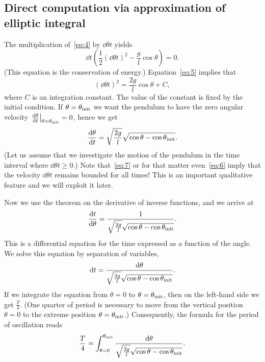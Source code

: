 \documentclass[reqno, a4paper]{amsart}
\begin{document}
\subsection{Direct computation via approximation of elliptic integral}
\label{sec:direct-comp-via}


The multiplication of~\eqref{eq:4} by $\dd{\theta}{t}$ yields
\begin{equation}
  \label{eq:5}
  \dd{}{t}
  \left(
    \frac{1}{2}
    \left(
      \dd{\theta}{t}
    \right)^2
    -
    \frac{g}{l}
    \cos \theta
  \right)
  =
  0
  .
\end{equation}
(This equation is the conservation of energy.) Equation~\eqref{eq:5} implies that
\begin{equation}
  \label{eq:6}
  \left(
    \dd{\theta}{t}
  \right)^2
  =
  \frac{2g}{l}
  \cos \theta
  +
  C
  ,
\end{equation}
where $C$ is an integration constant. The value of the constant is fixed by the initial condition. If $\theta = \theta_{\mathrm{init}}$ we want the pendulum to have the zero angular velocity $\left. \frac{\mathrm{d} {\theta}}{\mathrm{d} {t}} \right|_{\theta = \theta_{\mathrm{init}}}= 0$, hence we get
\begin{equation}
  \label{eq:7}
  \frac{\mathrm{d} {\theta}}{\mathrm{d} {t}}
  =
  \sqrt{
    \frac{2g}{l}
  }
  \sqrt{\cos \theta - \cos \theta_{\mathrm{init}}}.
\end{equation}
(Let us assume that we investigate the motion of the pendulum in the time interval where $\dd{\theta}{t} \geq 0$.) Note that~\eqref{eq:7} or for that matter even~\eqref{eq:6} imply that the velocity $\dd{\theta}{t}$ remains bounded for all times! This is an important qualitative feature and we will exploit it later.


Now we use the theorem on the derivative of inverse functions, and we arrive at
\begin{equation}
  \label{eq:8}
  \frac{\mathrm{d} {t}}{\mathrm{d} {\theta}}
  =
  \frac{1}
  {
    \sqrt{
      \frac{2g}{l}
    }
    \sqrt{\cos \theta - \cos \theta_{\mathrm{init}}}
  }
  .
\end{equation}
This is a differential equation for the time expressed as a function of the angle. We solve this equation by separation of variables,
\begin{equation}
  \label{eq:9}
  \mathrm{d} t  
  =
  \frac{\mathrm{d} \theta}
  {
    \sqrt{
      \frac{2g}{l}
    }
    \sqrt{\cos \theta - \cos \theta_{\mathrm{init}}}
  }
  .
\end{equation}
If we integrate the equation from $\theta=0$ to $\theta=\theta_{\mathrm{init}}$, then on the left-hand side we get $\frac{T}{4}$. (One quarter of period is necessary to move from the vertical position $\theta=0$ to the extreme position $\theta=\theta_{\mathrm{init}}$.) Consequently, the formula for the period of oscillation reads
\begin{equation}
  \label{eq:10}
  \frac{T}{4}
  =
  \int_{\theta=0}^{\theta_{\mathrm{init}}}
  \frac{\mathrm{d} \theta}
  {
    \sqrt{
      \frac{2g}{l}
    }
    \sqrt{\cos \theta - \cos \theta_{\mathrm{init}}}
  }
  .
\end{equation}
\end{document}
